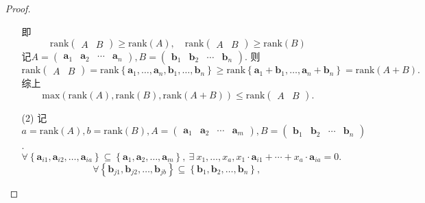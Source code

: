 \documentclass{article}
\begin{document}
\begin{enumerate}
\begin{proof}
\begin{enumerate}
                即\[\mbox{rank}\begin{pmatrix} A & B\end{pmatrix}\geqslant \mbox{rank}(A),
                \quad \mbox{rank}\begin{pmatrix} A & B\end{pmatrix}\geqslant \mbox{rank}(B)\]
                记$A=\begin{pmatrix}\boldsymbol{a}_1 & \boldsymbol{a}_2 & \cdots & \boldsymbol{a}_n \end{pmatrix},
                B=\begin{pmatrix}\boldsymbol{b}_1 & \boldsymbol{b}_2 & \cdots & \boldsymbol{b}_n \end{pmatrix}$.
                则\[
                    \mbox{rank}\begin{pmatrix} A & B\end{pmatrix}=
                    \mbox{rank}\left\{\boldsymbol{a}_1,\ldots,\boldsymbol{a}_n,\boldsymbol{b}_1,\ldots,\boldsymbol{b}_n \right\}
                    \geqslant
                    \mbox{rank}\left\{\boldsymbol{a}_1+\boldsymbol{b}_1,\ldots,\boldsymbol{a}_n+\boldsymbol{b}_n \right\}
                    =\mbox{rank}(A+B).
                \]
                综上\[\mbox{max}\left( \mbox{rank}(A),\mbox{rank}(B),\mbox{rank}(A+B)\right)\leqslant \mbox{rank} \begin{pmatrix} A & B\end{pmatrix}.\]
                \item [(2)]记$a=\mbox{rank}(A),b=\mbox{rank}(B),
                A=\begin{pmatrix}
                    \boldsymbol{a}_1 & \boldsymbol{a}_2 & \cdots & \boldsymbol{a}_m
                \end{pmatrix},
                B=\begin{pmatrix}
                    \boldsymbol{b}_1 & \boldsymbol{b}_2 & \cdots & \boldsymbol{b}_n
                \end{pmatrix}$.
                \[
                    \forall \left\{\boldsymbol{a}_{i1} , \boldsymbol{a}_{i2} , \ldots , \boldsymbol{a}_{ia}\right\}
                    \subseteq  \left\{\boldsymbol{a}_1 , \boldsymbol{a}_2 , \ldots , \boldsymbol{a}_m\right\},\ 
                    \exists \ x_1,\ldots,x_a,x_1\cdot\boldsymbol{a}_{i1}+\cdots+x_a\cdot\boldsymbol{a}_{ia}=0.
                \]
                \[
                    \forall \left\{\boldsymbol{b}_{j1} , \boldsymbol{b}_{j2} , \ldots , \boldsymbol{b}_{jb}\right\}
                    \subseteq  \left\{\boldsymbol{b}_1 , \boldsymbol{b}_2 , \ldots , \boldsymbol{b}_n\right\},\ 
\]
\end{enumerate}
\end{proof}
\end{enumerate}
\end{document}
